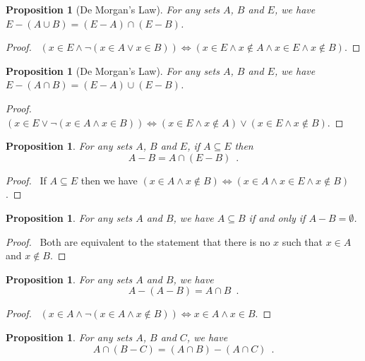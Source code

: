 \documentclass{report}
\let\qed\relax
\newtheorem{prop}[ax]{Proposition}
\theoremstyle{definition}
\begin{document}
\begin{prop}[De Morgan's Law]
For any sets $A$, $B$ and $E$, we have $E - (A \cup B) = (E - A) \cap (E - B)$.
\end{prop}

\begin{proof}
\pf\ $(x \in E \wedge \neg (x \in A \vee x \in B)) \Leftrightarrow (x \in E \wedge x \notin A \wedge x \in E \wedge x \notin B)$. \qed
\end{proof}

\begin{prop}[De Morgan's Law]
For any sets $A$, $B$ and $E$, we have $E - (A \cap B) = (E - A) \cup (E - B)$.
\end{prop}

\begin{proof}
\pf\ $(x \in E \vee \neg (x \in A \wedge x \in B)) \Leftrightarrow (x \in E \wedge x \notin A) \vee (x \in E \wedge x \notin B)$. \qed
\end{proof}

\begin{prop}
For any sets $A$, $B$ and $E$, if $A \subseteq E$ then\
\[ A - B = A \cap (E - B) \enspace . \]
\end{prop}

\begin{proof}
\pf\ If $A \subseteq E$ then we have $(x \in A \wedge x \notin B) \Leftrightarrow (x \in A \wedge x \in E \wedge x \notin B)$. \qed
\end{proof}

\begin{prop}
For any sets $A$ and $B$, we have $A \subseteq B$ if and only if $A - B = \emptyset$.
\end{prop}

\begin{proof}
\pf\ Both are equivalent to the statement that there is no $x$ such that $x \in A$ and $x \notin B$. \qed
\end{proof}

\begin{prop}
For any sets $A$ and $B$, we have
\[ A - (A - B) = A \cap B \enspace . \]
\end{prop}

\begin{proof}
\pf\ $(x \in A \wedge \neg (x \in A \wedge x \notin B)) \Leftrightarrow x \in A \wedge x \in B$. \qed
\end{proof}

\begin{prop}
For any sets $A$, $B$ and $C$, we have
\[ A \cap (B - C) = (A \cap B) - (A \cap C) \enspace . \]
\end{prop}
\end{document}
